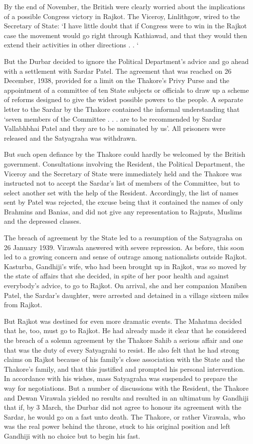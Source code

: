 By the end of November, the British were clearly worried about the implications of a possible Congress victory in Rajkot. The Viceroy, Linlithgow, wired to the Secretary of State: ‘I have little doubt that if Congress were to win in the Rajkot case the movement would go right through Kathiawad, and that they would then extend their activities in other directions . . ‘ 

But the Durbar decided to ignore the Political Department’s advice and go ahead with a settlement with Sardar Patel. The agreement that was reached on 26 December, 1938, provided for a limit on the Thakore’s Privy Purse and the appointment of a committee of ten State subjects or officials to draw up a scheme of reforms designed to give the widest possible powers to the people. A separate letter to the Sardar by the Thakore contained the informal understanding that ‘seven members of the Committee . . . are to be recommended by Sardar Vallabhbhai Patel and they are to be nominated by us’. All prisoners were released and the Satyagraha was withdrawn. 

But such open defiance by the Thakore could hardly be welcomed by the British government. Consultations involving the Resident, the Political Department, the Viceroy and the Secretary of State were immediately held and the Thakore was instructed not to accept the Sardar’s list of members of the Committee, but to select another set with the help of the Resident. Accordingly, the list of names sent by Patel was rejected, the excuse being that it contained the names of only Brahmins and Banias, and did not give any representation to Rajputs, Muslims and the depressed classes. 

The breach of agreement by the State led to a resumption of the Satyagraha on 26 January 1939. Virawala answered with severe repression. As before, this soon led to a growing concern and sense of outrage among nationalists outside Rajkot. Kasturba, Gandhiji’s wife, who had been brought up in Rajkot, was so moved by the state of affairs that she decided, in spite of her poor health and against everybody’s advice, to go to Rajkot. On arrival, she and her companion Maniben Patel, the Sardar’s daughter, were arrested and detained in a village sixteen miles from Rajkot. 

But Rajkot was destined for even more dramatic events. The Mahatma decided that he, too, must go to Rajkot. He had already made it clear that he considered the breach of a solemn agreement by the Thakore Sahib a serious affair and one that was the duty of every Satyagrahi to resist. He also felt that he had strong claims on Rajkot because of his family’s close association with the State and the Thakore’s family, and that this justified and prompted his personal intervention. In accordance with his wishes, mass Satyagraha was suspended to prepare the way for negotiations. But a number of discussions with the Resident, the Thakore and Dewan Virawala yielded no results and resulted in an ultimatum by Gandhiji that if, by 3 March, the Durbar did not agree to honour its agreement with the Sardar, he would go on a fast unto death. The Thakore, or rather Virawala, who was the real power behind the throne, stuck to his original position and left Gandhiji with no choice but to begin his fast. 


